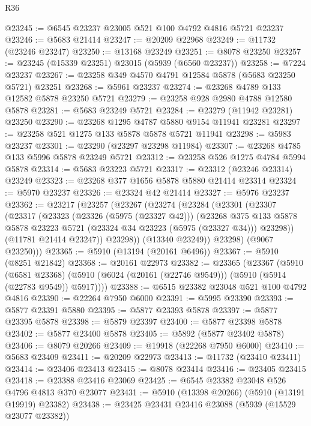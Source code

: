 \begin{lexlean}{R36}
\begin{coremodule}
@23245 := @6545 @23237 @23005 @521 @100 @4792 @4816 @5721 @23237
@23246 := @5683 @21414
@23247 := @20209 @22968
@23249 := @11732 (@23246 @23247)
@23250 := @13168 @23249
@23251 := @8078 @23250
@23257 := @23245 (@15339 @23251) @23015 (@5939 (@6560 @23237))
@23258 := @7224 @23237
@23267 := @23258 @349 @4570 @4791 @12584 @5878 (@5683 @23250 @5721) @23251
@23268 := @5961 @23237
@23274 := @23268 @4789 @133 @12582 @5878 @23250 @5721
@23279 := @23258 @928 @2980 @4788 @12580 @5878
@23281 := @5683 @23249 @5721
@23284 := @23279 (@11942 @23281) @23250
@23290 := @23268 @1295 @4787 @5880 @9154 @11941 @23281
@23297 := @23258 @521 @1275 @133 @5878 @5878 @5721 @11941
@23298 := @5983 @23237
@23301 := @23290 (@23297 @23298 @11984)
@23307 := @23268 @4785 @133 @5996 @5878 @23249 @5721
@23312 := @23258 @526 @1275 @4784 @5994 @5878
@23314 := @5683 @23223 @5721
@23317 := @23312 (@23246 @23314) @23249
@23323 := @23268 @377 @1656 @5878 @5880 @21414 @23314
@23324 := @5970 @23237
@23326 := @23324 @42 @21414
@23327 := @5976 @23237
@23362 := @23217
    (@23257
      (@23267
        (@23274
          (@23284
            (@23301
              (@23307
                (@23317
                  (@23323
                    (@23326 (@5975 (@23327 @42)))
                    (@23268
                      @375
                      @133
                      @5878
                      @5878
                      @23223
                      @5721
                      (@23324 @34 @23223 (@5975 (@23327 @34)))
                      @23298))
                  (@11781 @21414 @23247))
                @23298))
            (@13340 @23249))
          @23298)
        (@9067 @23250)))
@23365 := @5910 (@13194 (@20161 @6496))
@23367 := @5910 (@8251 @21842)
@23368 := @20161 @22973
@23382 := @23365
    (@23367
      (@5910
        (@6581 @23368)
        (@5910 (@6024 (@20161 (@22746 @9549))) (@5910 (@5914 (@22783 @9549)) @5917))))
@23388 := @6515 @23382 @23048 @521 @100 @4792 @4816
@23390 := @22264 @7950 @6000
@23391 := @5995 @23390
@23393 := @5877 @23391 @5880
@23395 := @5877 @23393 @5878
@23397 := @5877 @23395 @5878
@23398 := @5879 @23397
@23400 := @5877 @23398 @5878
@23402 := @5877 @23400 @5878
@23405 := @5892 (@5877 @23402 @5878)
@23406 := @8079 @20266
@23409 := @19918 (@22268 @7950 @6000)
@23410 := @5683 @23409
@23411 := @20209 @22973
@23413 := @11732 (@23410 @23411)
@23414 := @23406 @23413
@23415 := @8078 @23414
@23416 := @23405 @23415
@23418 := @23388 @23416 @23069
@23425 := @6545 @23382 @23048 @526 @4796 @4813 @370 @23077
@23431 := @5910 (@13398 @20266) (@5910 (@13191 @19919) @23382)
@23438 := @23425 @23431 @23416 @23088 (@5939 (@15529 @23077 @23382))

\end{coremodule}
\end{lexlean}
